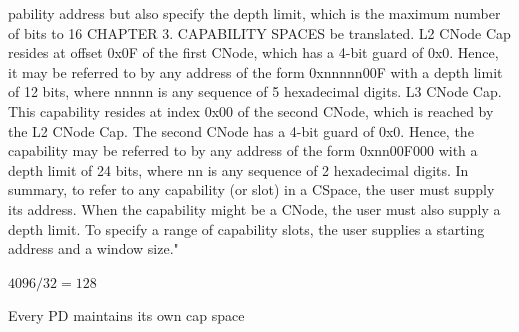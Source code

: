 pability address but also specify the depth limit, which is the maximum number of bits to
16 CHAPTER 3. CAPABILITY SPACES
be translated. L2 CNode Cap resides at offset 0x0F of the first CNode, which has a 4-bit
guard of 0x0. Hence, it may be referred to by any address of the form 0xnnnnn00F with a
depth limit of 12 bits, where nnnnn is any sequence of 5 hexadecimal digits.
L3 CNode Cap. This capability resides at index 0x00 of the second CNode, which is reached by
the L2 CNode Cap. The second CNode has a 4-bit guard of 0x0. Hence, the capability may
be referred to by any address of the form 0xnn00F000 with a depth limit of 24 bits, where
nn is any sequence of 2 hexadecimal digits.
In summary, to refer to any capability (or slot) in a CSpace, the user must supply its address.
When the capability might be a CNode, the user must also supply a depth limit. To specify a
range of capability slots, the user supplies a starting address and a window size.\cite{seL4:2024}" 

$4096 / 32 = 128$

\begin{figure}
    \centering
    \caption{}
    \label{fig:sdfsdfg}
\end{figure}


Every PD maintains its own cap space